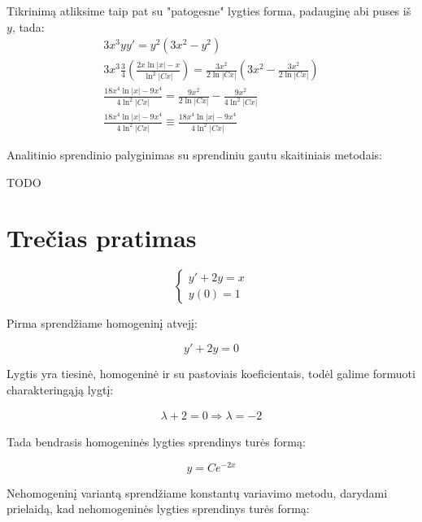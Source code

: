 \documentclass[11pt]{article}
\begin{document}
Tikrinimą atliksime taip pat su "patogesne" lygties forma, padauginę abi puses iš $y$, tada:
\begin{equation}
\begin{split}
3x^3yy'=y^2(3x^2-y^2)\\
3x^3\frac{3}{4}\left(\frac{2x\ln|x|-x}{\ln^2|Cx|}\right)=\frac{3x^2}{2\ln|Cx|}\left(3x^2-\frac{3x^2}{2\ln|Cx|}\right)\\
\frac{18x^4\ln|x|-9x^4}{4\ln^2|Cx|}=\frac{9x^2}{2\ln|Cx|}-\frac{9x^2}{4\ln^2|Cx|}\\
\frac{18x^4\ln|x|-9x^4}{4\ln^2|Cx|}\equiv\frac{18x^4\ln|x|-9x^4}{4\ln^2|Cx|}
\end{split}
\end{equation}

Analitinio sprendinio palyginimas su sprendiniu gautu skaitiniais metodais:

TODO

\newpage
\section{Trečias pratimas}

\begin{equation}
\begin{cases}
     y'+2y=x  \\
     y(0)=1 
\end{cases}
\end{equation}

Pirma sprendžiame homogeninį atvejį:

\begin{equation}
y'+2y=0
\end{equation}

Lygtis yra tiesinė, homogeninė ir su pastoviais koeficientais, todėl galime formuoti charakteringąją lygtį:

\begin{equation}
\begin{split}
\lambda+2=0 \Rightarrow \lambda=-2
\end{split}
\end{equation}

Tada bendrasis homogeninės lygties sprendinys turės formą:

\begin{equation}
y=Ce^{-2x}
\end{equation}

Nehomogeninį variantą sprendžiame konstantų variavimo metodu, darydami prielaidą, kad nehomogeninės lygties sprendinys turės formą:
\end{document}
